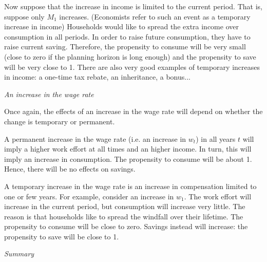 \documentclass[letterpaper,12pt]{article}
\begin{document}
Now suppose that the increase in income is limited to the current
period. That is, suppose only $M_{1}$ increases. (Economists refer
to such an event as a temporary increase in income) Households
would like to spread the extra income over consumption in all
periods. In order to raise future consumption, they have to raise
current saving. Therefore, the propensity to consume will be very
small (close to zero if the planning horizon is long enough) and
the propensity to save will be very close to 1. There are also
very good examples of temporary increases in income: a one-time
tax rebate, an inheritance, a bonus...


\textit{An increase in the wage rate}

Once again, the effects of an increase in the wage rate will
depend on whether the change is temporary or permanent.

A permanent increase in the wage rate (i.e. an increase in $w_{t}$) in all years $t$ will imply a
higher work effort at all times and an higher income. In turn, this will imply an increase in
consumption. The propensity to consume will be about 1. Hence, there will be no effects on
savings.

A temporary increase in the wage rate is an increase in compensation limited to one or few years.
For example, consider an increase in $w_{1}$. The work effort will increase in the current period,
but consumption will increase very little. The reason is that households like to spread the
windfall over their lifetime. The propensity to consume will be close to zero. Savings instead
will increase: the propensity to save will be close to 1.

\newpage

\textit{Summary}

\vspace{-.4cm}
\end{document}
